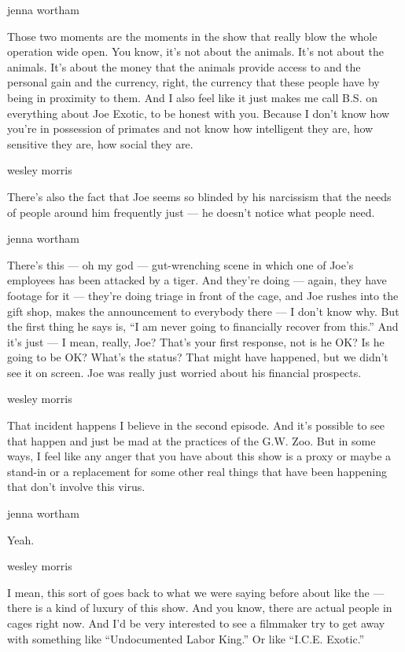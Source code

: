 jenna wortham

Those two moments are the moments in the show that really blow the whole
operation wide open. You know, it's not about the animals. It's not
about the animals. It's about the money that the animals provide access
to and the personal gain and the currency, right, the currency that
these people have by being in proximity to them. And I also feel like it
just makes me call B.S. on everything about Joe Exotic, to be honest
with you. Because I don't know how you're in possession of primates and
not know how intelligent they are, how sensitive they are, how social
they are.

wesley morris

There's also the fact that Joe seems so blinded by his narcissism that
the needs of people around him frequently just --- he doesn't notice
what people need.

jenna wortham

There's this --- oh my god --- gut-wrenching scene in which one of Joe's
employees has been attacked by a tiger. And they're doing --- again,
they have footage for it --- they're doing triage in front of the cage,
and Joe rushes into the gift shop, makes the announcement to everybody
there --- I don't know why. But the first thing he says is, ``I am never
going to financially recover from this.'' And it's just --- I mean,
really, Joe? That's your first response, not is he OK? Is he going to be
OK? What's the status? That might have happened, but we didn't see it on
screen. Joe was really just worried about his financial prospects.

wesley morris

That incident happens I believe in the second episode. And it's possible
to see that happen and just be mad at the practices of the G.W. Zoo. But
in some ways, I feel like any anger that you have about this show is a
proxy or maybe a stand-in or a replacement for some other real things
that have been happening that don't involve this virus.

jenna wortham

Yeah.

wesley morris

I mean, this sort of goes back to what we were saying before about like
the --- there is a kind of luxury of this show. And you know, there are
actual people in cages right now. And I'd be very interested to see a
filmmaker try to get away with something like ``Undocumented Labor
King.'' Or like ``I.C.E. Exotic.''

